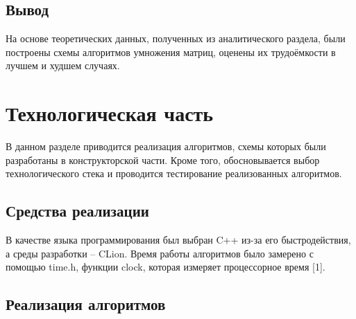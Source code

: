 \documentclass[12pt]{report}
\begin{document}
\section{Вывод}
	На основе теоретических данных, полученных из аналитического раздела, были построены схемы алгоритмов умножения матриц, оценены их трудоёмкости в лучшем и худшем случаях.

\chapter{Технологическая часть}
В данном разделе приводится реализация алгоритмов, схемы которых были разработаны в конструкторской части. Кроме того, обосновывается выбор технологического стека и проводится тестирование реализованных алгоритмов.
\section{Средства реализации}

В качестве языка программирования был выбран C++ из-за его быстродействия, а среды разработки -- CLion. Время работы алгоритмов было замерено с помощью time.h, функции clock, которая измеряет процессорное время [1].

\section{Реализация алгоритмов}
\end{document}
